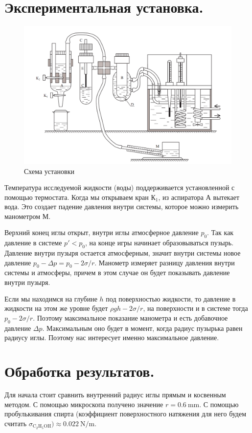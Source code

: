 \documentclass[a4paper,12pt]{report}
\begin{document}
\begin{multicols}{2}
        \section{Экспериментальная установка.}
        \begin{figure}[H]
            \centering
            \includegraphics[width=\columnwidth]{../img/ustanovka.png}
            \caption{Схема установки}
        \end{figure}
        Температура исследуемой жидкости (воды) поддерживается установленной с помощью термостата. Когда мы открываем кран К$_1$, из аспиратора А вытекает вода. Это создает падение давления внутри системы, которое можно измерить манометром М.

        Верхний конец иглы открыт, внутри иглы атмосферное давление $p_0$. Так как давление в системе $p'<p_0$, на конце игры начинает образовываться пузырь. Давление внутри пузыря остается атмосферным, значит внутри системы новое давление $p_0-\Delta p=p_0-2\sigma/r$. Манометр измеряет разницу давления внутри системы и атмосферы, причем в этом случае он будет показывать давление внутри пузыря.

        Если мы находимся на глубине $h$ под поверхностью жидкости, то давление в жидкости на этом же уровне будет $\rho g h -2\sigma/r$, на поверхности и в системе тогда $p_0-2\sigma/r$. Поэтому максимальное показание манометра и есть добавочное давление $\Delta p$. Максимальным оно будет в момент, когда радиус пузырька равен радиусу иглы. Поэтому нас интересует именно максимальное давление.
        \newcolumn
        \section{Обработка результатов.}
        Для начала стоит сравнить внутренний радиус иглы прямым и косвенным методом. С помощью микроскопа получено значение $r=0.6 \ \text{mm}$. С помощью пробулькивания спирта (коэффициент поверхностного натяжения для него будем считать $\sigma_{\text{C}_2\text{H}_5\text{OH}})\approx 0.022 \ \text{N}/\text{m}$. 


\end{multicols}
\end{document}
